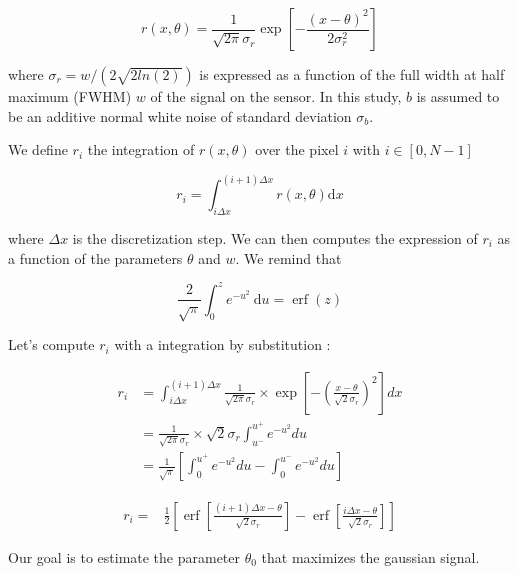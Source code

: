 \documentclass[10pt,letterpaper]{article}
\begin{document}
\begin{equation}
     r(x, \theta)=\frac{1}{\sqrt{2 \pi} \sigma_{r}} \exp \left[-\frac{(x-\theta)^{2}}{2 \sigma_{r}^{2}}\right]     
\end{equation}


where $\sigma_{r} = w/(2\sqrt{2ln(2)})$ is expressed as a function of the full width at half maximum (FWHM) $w$ of the signal on the sensor. In this study, $b$ is assumed to be an additive normal white noise of standard deviation $\sigma_{b}$.

We define $r_{i}$ the integration of $r(x, \theta)$ over the pixel $i$ with $i \in[0, N-1]$


\begin{equation}
     r_{i}=\int_{i \Delta x}^{(i+1) \Delta x} r(x, \theta) \mathrm{d} x
\end{equation}


where $\Delta x$ is the discretization step. We can then computes the expression of $r_{i}$ as a function of the parameters $\theta$ and $w$. We remind that


\begin{equation*}
\frac{2}{\sqrt{\pi}} \int_{0}^{z} e^{-u^{2}} \mathrm{~d} u=\operatorname{erf}(z)
\end{equation*}

\pagebreak

Let's compute $r_i$ with a integration by substitution :


\begin{align}
     r_i & =\int_{i \Delta x}^{(i+1) \Delta x} \frac{1}{\sqrt{2 \pi} \sigma_r} \times \exp \left[-\left(\frac{x-\theta}{\sqrt{2} \sigma_r}\right)^2\right] d x \\
     & =\frac{1}{\sqrt{2 \pi} \sigma_r} \times \sqrt{2} \sigma_r \int_{u^{-}}^{u^{+}} e^{-u^2} d u \\
     & =\frac{1}{\sqrt{\pi}}\left[\int_0^{u^{+}} e^{-u^2} d u-\int_0^{u^{-}} e^{-u^2} d u\right]
\end{align}

\begin{align}
r_i= & \frac{1}{2}\left[\operatorname{erf}\left[\frac{(i+1) \Delta x-\theta}{\sqrt{2} \sigma_r}\right]-\operatorname{erf}\left[\frac{i \Delta x-\theta}{\sqrt{2} \sigma_r}\right]\right]
\end{align}

Our goal is to estimate the parameter $\theta_0$ that maximizes the gaussian signal.
\end{document}
